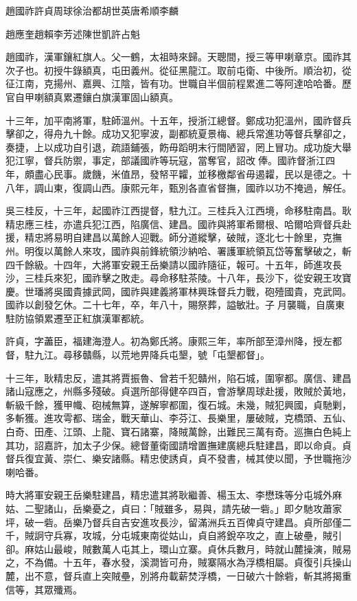 
\begin{pinyinscope}
趙國祚許貞周球徐治都胡世英唐希順李麟

趙應奎趙賴李芳述陳世凱許占魁

趙國祚，漢軍鑲紅旗人。父一鶴，太祖時來歸。天聰間，授三等甲喇章京。國祚其次子也。初授牛錄額真，屯田義州。從征黑龍江。取前屯衛、中後所。順治初，從征江南，克揚州、嘉興、江陰，皆有功。世職自半個前程累進二等阿達哈哈番。歷官自甲喇額真累遷鑲白旗漢軍固山額真。

十三年，加平南將軍，駐師溫州。十五年，授浙江總督。鄭成功犯溫州，國祚督兵擊卻之，得舟九十餘。成功又犯寧波，副都統夏景梅、總兵常進功等督兵擊卻之，奏捷，上以成功自引退，疏語鋪張，飭毋蹈明末行間陋習，罔上冒功。成功旋大舉犯江寧，督兵防禦，事定，部議國祚等玩寇，當奪官，詔改俸。國祚督浙江四年，頗盡心民事。歲饑，米值昂，發帑平糶，並移檄鄰省毋遏糶，民以是德之。十八年，調山東，復調山西。康熙元年，甄別各直省督撫，國祚以功不掩過，解任。

吳三桂反，十三年，起國祚江西提督，駐九江。三桂兵入江西境，命移駐南昌。耿精忠應三桂，亦遣兵犯江西，陷廣信、建昌。國祚與將軍希爾根、哈爾哈齊督兵赴援，精忠將易明自建昌以萬餘人迎戰。師分道縱擊，破賊，逐北七十餘里，克撫州。明復以萬餘人來攻，國祚與前鋒統領沙納哈、署護軍統領瓦岱等奮擊破之，斬四千餘級。十四年，大將軍安親王岳樂請以國祚隨征，報可。十五年，師進攻長沙，三桂兵來犯，國祚擊之敗走。尋命移駐茶陵。十八年，長沙下，從安親王攻寶慶。世璠將吳國貴據武岡，國祚與建義將軍林興珠督兵力戰，砲殪國貴，克武岡。國祚以創發乞休。二十七年，卒，年八十，賜祭葬，謚敏壯。子月襲職，自廣東駐防協領累遷至正紅旗漢軍都統。

許貞，字藎臣，福建海澄人。初為鄭氏將。康熙三年，率所部至漳州降，授左都督，駐九江。尋移贛縣，以荒地畀降兵屯墾，號「屯墾都督」。

十三年，耿精忠反，遣其將賈振魯、曾若千犯贛州，陷石城，圍寧都。廣信、建昌諸山寇應之，州縣多殘破。貞選所部得健卒四百，會游擊周球赴援，敗賊於黃地，斬級千餘，獲甲幟、砲械無算，遂解寧都圍，復石城。未幾，賊犯興國，貞馳剿，多斬獲。進攻雩都、瑞金，戰天華山、李芬江、長樂里，屢破賊，克橋頭、五仙、白奇、田產、江頭、上龍、寶石諸寨，降賊萬餘，出難民三萬有奇。巡撫白色純上其功，詔嘉許，加太子少保。總督董衛國請增置撫建廣總兵駐建昌，即以命貞。貞督兵復宜黃、崇仁、樂安諸縣。精忠使誘貞，貞不發書，械其使以聞，予世職拖沙喇哈番。

時大將軍安親王岳樂駐建昌，精忠遣其將耿繼善、楊玉太、李懋珠等分屯城外麻姑、二聖諸山，岳樂憂之，貞曰：「賊雖多，易與，請先破一砦。」即夕馳攻蕭家坪，破一砦。岳樂乃督兵自吉安進攻長沙，留滿洲兵五百俾貞守建昌。貞所部僅二千，賊詗守兵寡，攻城，分屯城東南從姑山，貞自將銳卒攻之，直上破壘，賊引卻。麻姑山最峻，賊數萬人屯其上，環山立寨。貞休兵數月，時就山麓操演，賊易之，不為備。十五年，春水發，溪澗皆可舟，賊寨隔水為浮橋相屬。貞復引兵操山麓，出不意，督兵直上突賊壘，別將舟載薪焚浮橋，一日破六十餘砦，斬其將揭重信等，其眾殲焉。


\end{pinyinscope}
